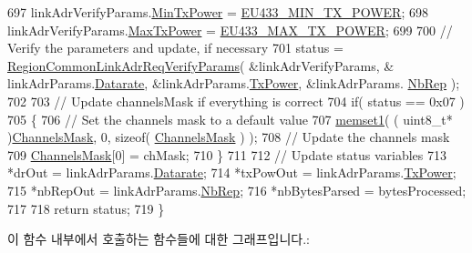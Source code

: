 \begin{DoxyCode}
697     linkAdrVerifyParams.\mbox{\hyperlink{structs_region_common_link_adr_req_verify_params_afe7bf10e9fadd8be6beb31e8b91a1ba2}{MinTxPower}} = \mbox{\hyperlink{group___r_e_g_i_o_n_e_u433_gadb49eb1bda0c5ae6b68eb817bf4d4810}{EU433\_MIN\_TX\_POWER}};
698     linkAdrVerifyParams.\mbox{\hyperlink{structs_region_common_link_adr_req_verify_params_a118829b26fb7d913d4202d5d06356a95}{MaxTxPower}} = \mbox{\hyperlink{group___r_e_g_i_o_n_e_u433_gaac93ce9446f1e4b5c3c09c9b2ebf2297}{EU433\_MAX\_TX\_POWER}};
699 
700     \textcolor{comment}{// Verify the parameters and update, if necessary}
701     status = \mbox{\hyperlink{group___r_e_g_i_o_n_c_o_m_m_o_n_ga2c87f98f09793dc7fa63a9801feeed73}{RegionCommonLinkAdrReqVerifyParams}}( &linkAdrVerifyParams, &
      linkAdrParams.\mbox{\hyperlink{structs_region_common_link_adr_params_ae2f6080f3aa0e9485c55513ca56bb24d}{Datarate}}, &linkAdrParams.\mbox{\hyperlink{structs_region_common_link_adr_params_a037b4f849fa8ed4aa1d3c58aef2b28ec}{TxPower}}, &linkAdrParams.
      \mbox{\hyperlink{structs_region_common_link_adr_params_a3b99538671d86dbfe2f6754ce6f9577a}{NbRep}} );
702 
703     \textcolor{comment}{// Update channelsMask if everything is correct}
704     \textcolor{keywordflow}{if}( status == 0x07 )
705     \{
706         \textcolor{comment}{// Set the channels mask to a default value}
707         \mbox{\hyperlink{utilities_8c_a272ed6d691263d9762c98ed720b1fa3a}{memset1}}( ( uint8\_t* )\mbox{\hyperlink{_region_e_u433_8c_a2188957b5ca6af8092154d7ccbfa5757}{ChannelsMask}}, 0, \textcolor{keyword}{sizeof}( 
      \mbox{\hyperlink{_region_e_u433_8c_a2188957b5ca6af8092154d7ccbfa5757}{ChannelsMask}} ) );
708         \textcolor{comment}{// Update the channels mask}
709         \mbox{\hyperlink{_region_e_u433_8c_a2188957b5ca6af8092154d7ccbfa5757}{ChannelsMask}}[0] = chMask;
710     \}
711 
712     \textcolor{comment}{// Update status variables}
713     *drOut = linkAdrParams.\mbox{\hyperlink{structs_region_common_link_adr_params_ae2f6080f3aa0e9485c55513ca56bb24d}{Datarate}};
714     *txPowOut = linkAdrParams.\mbox{\hyperlink{structs_region_common_link_adr_params_a037b4f849fa8ed4aa1d3c58aef2b28ec}{TxPower}};
715     *nbRepOut = linkAdrParams.\mbox{\hyperlink{structs_region_common_link_adr_params_a3b99538671d86dbfe2f6754ce6f9577a}{NbRep}};
716     *nbBytesParsed = bytesProcessed;
717 
718     \textcolor{keywordflow}{return} status;
719 \}
\end{DoxyCode}
이 함수 내부에서 호출하는 함수들에 대한 그래프입니다.\+:
\mbox{\label{group___r_e_g_i_o_n_e_u433_ga1df9d3b633c355a6b1d2b7fc1e0e217b}} 
